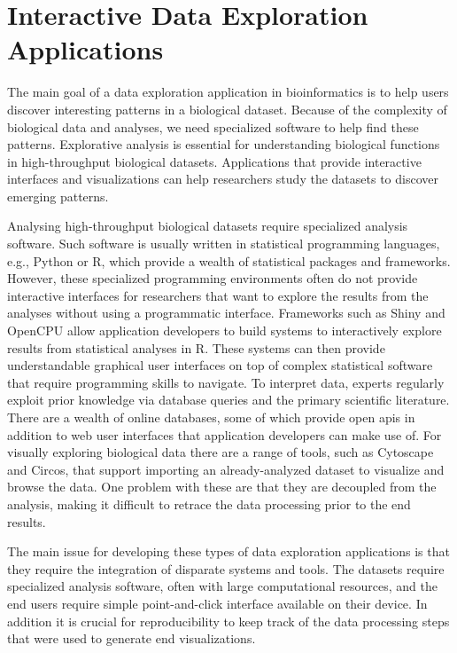 \chapter{Interactive Data Exploration Applications}\label{interactive}
The main goal of a data exploration application in bioinformatics is to help
users discover interesting patterns in a biological dataset. Because of the
complexity of biological data and analyses, we need specialized software to help
find these patterns. Explorative analysis is essential for understanding
biological functions in high-throughput biological datasets. Applications that
provide interactive interfaces and visualizations can help researchers study the
datasets to discover emerging patterns. 

Analysing high-throughput biological datasets require specialized analysis
software.  Such software is usually written in statistical programming
languages, e.g., Python or R, which provide a wealth of statistical packages and
frameworks. However, these specialized programming environments often do not
provide interactive interfaces for researchers that want to explore the results
from the analyses without using a programmatic interface.  Frameworks such as
Shiny\cite{shiny} and OpenCPU\cite{opencpu} allow application developers to
build systems to interactively explore results from statistical analyses in R.
These systems can then provide understandable graphical user interfaces on top
of complex statistical software that require programming skills to navigate.
To interpret data, experts regularly exploit prior knowledge via database
queries and the primary scientific literature. There are a wealth of online
databases, some of which provide open \glspl{api} in addition to web user
interfaces that application developers can make use of. For visually exploring
biological data there are a range of tools, such as Cytoscape\cite{cytoscape}
and Circos\cite{circos}, that support importing an already-analyzed dataset to
visualize and browse the data. One problem with these are that they are
decoupled from the analysis, making it difficult to retrace the data processing
prior to the end results.  

The main issue for developing these types of data exploration applications is
that they require the integration of disparate systems and tools. The datasets
require specialized analysis software, often with large computational resources,
and the end users require simple point-and-click interface available on their
device. In addition it is crucial for reproducibility to keep track of the 
data processing steps that were used to generate end visualizations. 

